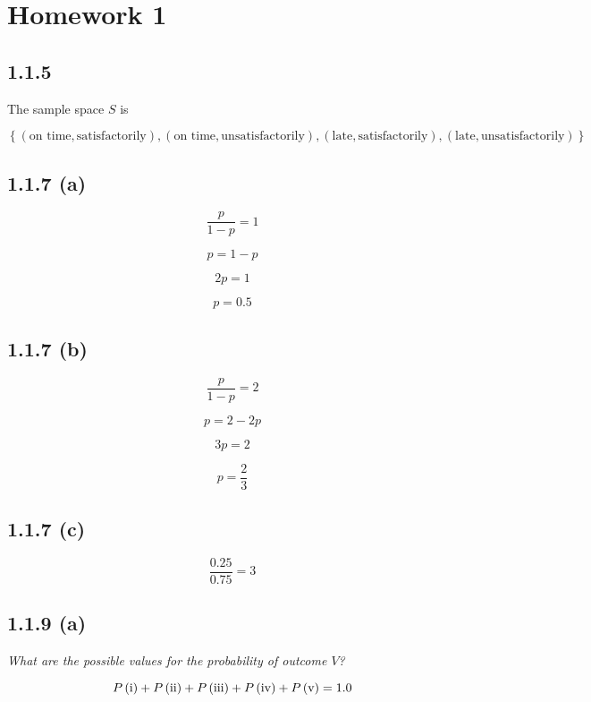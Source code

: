 \documentclass{article}
\begin{document}
\section*{Homework 1}

\subsection*{1.1.5}

The sample space $S$ is

\[
\left\{
\left(\text{on time}, \text{satisfactorily}\right),
\left(\text{on time}, \text{unsatisfactorily}\right),
\left(\text{late}, \text{satisfactorily}\right),
\left(\text{late}, \text{unsatisfactorily}\right)
\right\}
\]

\subsection*{1.1.7 (a)}

\[
\frac{p}{1-p} = 1
\]

\[
p = 1 - p
\]

\[
2p = 1
\]

\[
\boxed{p = 0.5}
\]

\subsection*{1.1.7 (b)}

\[
\frac{p}{1-p} = 2
\]

\[
p = 2 - 2p
\]

\[
3p = 2
\]

\[
\boxed{p = \frac{2}{3}}
\]

\subsection*{1.1.7 (c)}

\[
\boxed{\frac{0.25}{0.75} = 3}
\]

\subsection*{1.1.9 (a)}

\textit{What are the possible values for the probability of outcome $V$?}

\[
P\left(\textrm{\romannumeral 1}\right) +
P\left(\textrm{\romannumeral 2}\right) +
P\left(\textrm{\romannumeral 3}\right) +
P\left(\textrm{\romannumeral 4}\right) +
P\left(\textrm{\romannumeral 5}\right) =
1.0
\]
\end{document}
